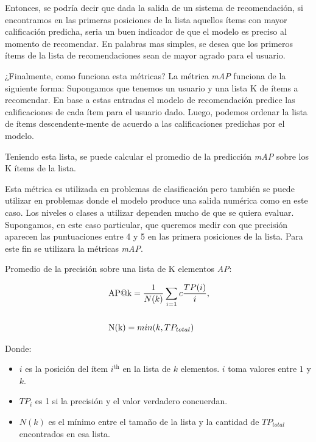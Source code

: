 \documentclass[11pt,a4paper,twoside]{thesis}
\begin{document}
Entonces, se podría decir que dada la salida de un sistema de recomendación, si
encontramos en las primeras posiciones de la lista aquellos ítems con mayor
calificación predicha, seria un buen indicador de que el modelo es preciso al
momento de recomendar. En palabras mas simples, se desea que los primeros ítems
de la lista de recomendaciones sean de mayor agrado para el usuario.

¿Finalmente, como funciona esta métricas? La métrica
\textit{mAP\makeatletter@k} funciona de la siguiente forma: Supongamos que tenemos
un usuario y una lista K de ítems a recomendar. En base
a estas entradas el modelo de recomendación predice las calificaciones de cada
ítem para el usuario dado. Luego, podemos ordenar la lista de ítems
descendente-mente de acuerdo a las calificaciones predichas por el modelo.

Teniendo esta lista, se puede calcular el promedio de la predicción
\textit{mAP\makeatletter@k} sobre los K ítems de la lista.

Esta métrica es utilizada en problemas de clasificación pero también se puede
utilizar en problemas donde el modelo produce una salida numérica como en este
caso. Los niveles o clases a utilizar dependen mucho de que se quiera evaluar.
Supongamos, en este caso particular, que queremos medir con que precisión
aparecen las puntuaciones entre 4 y 5 en las primera posiciones de la lista.
Para este fin se utilizara la métricas \textit{mAP\makeatletter@k}.

\begin{description}
	\item[Promedio de la precisión sobre una lista de K elementos
	\textit{AP\makeatletter@k}:]
\end{description}
\begin{equation}
	\begin{split}
		& \operatorname{AP\makeatletter@k}=\frac{1}{N(k)} \sum_{i=1}c \frac{ TP(i)}{i}, \\
		& \\
		& \operatorname{N(k)} = min(k, TP_{total}) \\
	\end{split}
\end{equation}
\begin{description}
	\item[Donde:]
\end{description}
\begin{itemize}
	\item $i$ es la posición del ítem $i^\mathrm{th}$ en la lista de $k$ elementos. $i$  toma valores entre $1$ y $k$.
	\item $TP_i$ es 1 si la precisión y el valor verdadero concuerdan.
	\item $N(k)$ es el mínimo entre el tamaño de la lista y la cantidad de $TP_{total}$ encontrados en esa lista.
\end{itemize}
\end{document}
